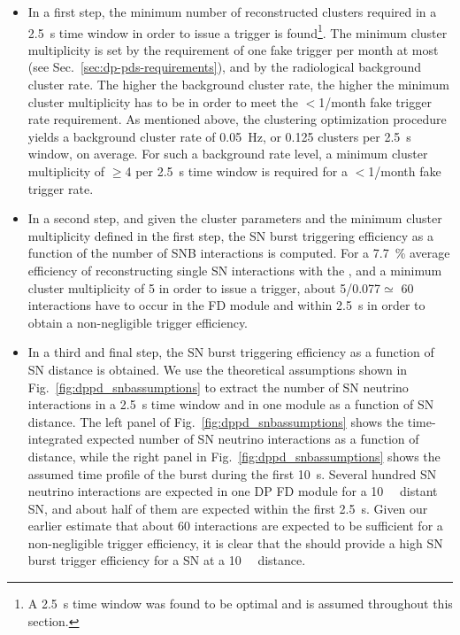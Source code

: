 \begin{itemize}
\item In a first step, the minimum number of reconstructed clusters required in a \SI{2.5}{\s} time window in order to issue a trigger is found\footnote{A \SI{2.5}{\s} time window was found to be optimal and is assumed throughout this section.}. The minimum cluster multiplicity is set by the requirement of one fake trigger per month at most (see Sec.~\ref{sec:dp-pds-requirements}), and by the radiological background cluster rate. The higher the background cluster rate, the higher the minimum cluster multiplicity has to be in order to meet the $<$\num{1}/month fake trigger rate requirement. As mentioned above, the clustering optimization procedure yields a background cluster rate of \SI{0.05}{\Hz}, or \num{0.125} clusters per \SI{2.5}{\s} window, on average. For such a background rate level, a minimum cluster multiplicity of $\ge$\num{4} per \SI{2.5}{\s} time window is required for a $<$\num{1}/month fake trigger rate.
%
\item In a second step, and given the cluster parameters and the minimum cluster multiplicity defined in the first step, the SN burst triggering efficiency as a function of the number of SNB interactions is computed. For a \SI{7.7}{\%} average efficiency of reconstructing single SN \nue interactions with the , and a minimum cluster multiplicity of \num{5} in order to issue a trigger, about \num{5}/\num{0.077}$\simeq$ \num{60} interactions have to occur in the FD module and within \SI{2.5}{\s} in order to obtain a non-negligible trigger efficiency. 
%
\item In a third and final step, the SN burst triggering efficiency as a function of SN distance is obtained. We use the theoretical assumptions shown in Fig.~\ref{fig:dppd_snbassumptions} to extract the number of SN neutrino interactions in a \SI{2.5}{\s} time window and in one   module as a function of SN distance. The left panel of Fig.~\ref{fig:dppd_snbassumptions} shows the time-integrated expected number of SN neutrino interactions as a function of distance, while the right panel in Fig.~\ref{fig:dppd_snbassumptions} shows the assumed time profile of the burst during the first \SI{10}{\s}. Several hundred SN neutrino interactions are expected in one DP FD module for a \SI{10}{\kilo\parsec} distant SN, and about half of them are expected within the first \SI{2.5}{\s}. Given our earlier estimate that about \num{60} interactions are expected to be sufficient for a non-negligible trigger efficiency, it is clear that the  should provide a high SN burst trigger efficiency for a SN at a \SI{10}{\kilo\parsec} distance.
\end{itemize}

